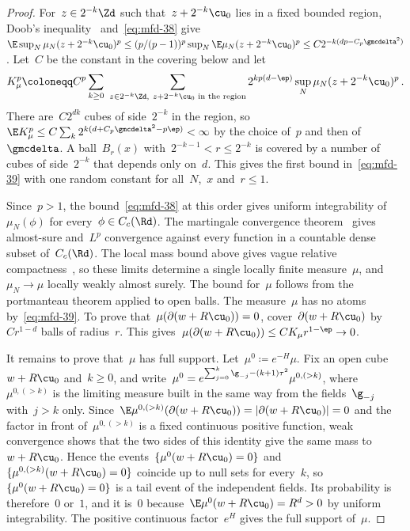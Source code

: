 \documentclass[11pt]{amsart}
\begin{document}
\begin{proof}
For~$z\in2^{-k}\Zd$ such that~$z+2^{-k}\cu_0$ lies in a fixed bounded region, Doob's inequality~\citep[Proposition~7.16]{Kallenberg} and~\eqref{eq:mfd-38} give~$\E\sup_N\mu_N(z+2^{-k}\cu_0)^p\leq(p/(p-1))^p\sup_N\E\mu_N(z+2^{-k}\cu_0)^p \leq C2^{-k(dp-C_p\gmcdelta^2)}$. Let~$C$ be the constant in the covering below and let
\begin{equation*}
	K_\mu^p\coloneqq C^p\sum_{k\geq0}\ \sum_{z\in2^{-k}\Zd,\ z+2^{-k}\cu_0\text{ in the region}}
	2^{kp(d-\ep)}\sup_N\mu_N(z+2^{-k}\cu_0)^p\,.
\end{equation*}
There are~$C2^{dk}$ cubes of side~$2^{-k}$ in the region, so~$\E K_\mu^p\leq C\sum_k2^{k(d+C_p\gmcdelta^2-p\ep)}<\infty$ by the choice of~$p$ and then of~$\gmcdelta$. A ball~$B_r(x)$ with~$2^{-k-1}<r\leq2^{-k}$ is covered by a number of cubes of side~$2^{-k}$ that depends only on~$d$. This gives the first bound in~\eqref{eq:mfd-39} with one random constant for all~$N$,~$x$ and~$r\leq1$.

\smallskip

Since~$p>1$, the bound~\eqref{eq:mfd-38} at this order gives uniform integrability of~$\mu_N(\phi)$ for every~$\phi\in C_c(\Rd)$. The martingale convergence theorem~\citep[Theorem~7.18 and Corollary~7.22]{Kallenberg} gives almost-sure and~$L^p$ convergence against every function in a countable dense subset of~$C_c(\Rd)$. The local mass bound above gives vague relative compactness~\citep[Theorem~A2.3]{Kallenberg}, so these limits determine a single locally finite measure~$\mu$, and~$\mu_N\to\mu$ locally weakly almost surely. The bound for~$\mu$ follows from the portmanteau theorem applied to open balls. The measure~$\mu$ has no atoms by~\eqref{eq:mfd-39}. To prove that~$\mu(\partial(w+R\cu_0))=0$, cover~$\partial(w+R\cu_0)$ by~$Cr^{1-d}$ balls of radius~$r$. This gives~$\mu(\partial(w+R\cu_0))\leq CK_\mu r^{1-\ep}\to0$.

\smallskip

It remains to prove that~$\mu$ has full support. Let~$\mu^0\coloneqq e^{-H}\mu$. Fix an open cube~$w+R\cu_0$ and~$k\geq0$, and write~$\mu^0=e^{\sum_{j=0}^k\g_{-j}-(k+1)\tau^2}\mu^{0,(>k)}$, where~$\mu^{0,(>k)}$ is the limiting measure built in the same way from the fields~$\g_{-j}$ with~$j>k$ only. Since~$\E \mu^{0,(>k)}(\partial(w+R\cu_0))=|\partial(w+R\cu_0)|=0$ and the factor in front of~$\mu^{0,(>k)}$ is a fixed continuous positive function, weak convergence shows that the two sides of this identity give the same mass to~$w+R\cu_0$. Hence the events~$\{\mu^0(w+R\cu_0)=0\}$ and~$\{\mu^{0,(>k)}(w+R\cu_0)=0\}$ coincide up to null sets for every~$k$, so~$\{\mu^0(w+R\cu_0)=0\}$ is a tail event of the independent fields. Its probability is therefore~$0$ or~$1$, and it is~$0$ because~$\E \mu^0(w+R\cu_0)=R^d>0$ by uniform integrability. The positive continuous factor~$e^H$ gives the full support of~$\mu$.
\end{proof}
\end{document}
